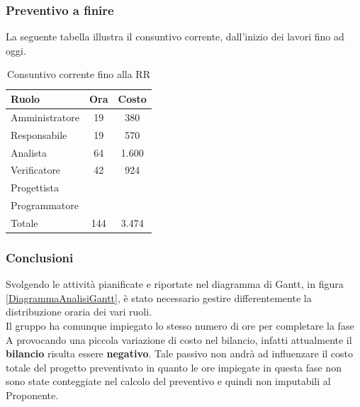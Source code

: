 	\subsubsection{Preventivo a finire}
	La seguente tabella illustra il consuntivo corrente, dall'inizio dei lavori fino ad oggi.
	\begin{table}[!h]
		\centering
		\begin{tabular}{|l|c|c|}
			\hline
			Ruolo & Ora & Costo\\
			\hline
			Amministratore & 19 & 380\\
			Responsabile & 19 & 570\\
			Analista & 64 & 1.600\\
			Verificatore & 42 & 924\\
			Progettista &  & \\
			Programmatore & & \\	
			\hline
			Totale &144 &3.474\\
			\hline			
		\end{tabular}
		\caption{Consuntivo corrente fino  alla RR}
	\end{table}
	
	\subsubsection{Conclusioni}
	\label{CCA}
	Svolgendo le attività pianificate e riportate nel diagramma di Gantt\glossario{}, in figura \ref{DiagrammaAnalisiGantt}, è stato necessario gestire differentemente la distribuzione oraria dei vari ruoli.\\
	Il gruppo ha comunque impiegato lo stesso numero di ore per completare la fase A provocando una piccola variazione di costo nel bilancio, infatti attualmente il \textbf{bilancio} risulta essere \textbf{negativo}. Tale passivo non andrà ad influenzare il costo totale del progetto preventivato in quanto le ore impiegate in questa fase non sono state conteggiate nel calcolo del preventivo e quindi non imputabili al Proponente.
\pagebreak
